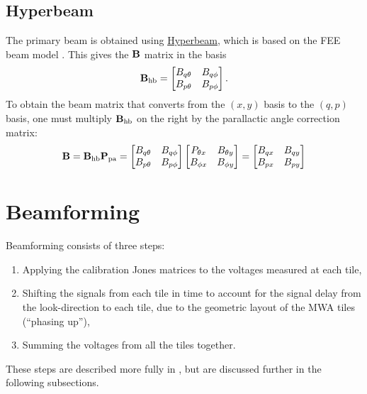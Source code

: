 \documentclass{book}
\newcommand{\pamat}{\ensuremath{{\bf P}_\text{pa}}}
\begin{document}
\subsection{Hyperbeam}
\label{sec:hyperbeam}

The primary beam is obtained using \href{https://github.com/MWATelescope/mwa_hyperbeam}{Hyperbeam}, which is based on the FEE beam model \citep{Sokolowski2017}.
This gives the ${\bf B}$ matrix in the basis
\begin{equation}
    {\bf B}_\text{hb} = \begin{bmatrix} B_{q\theta} & B_{q\phi} \\ B_{p\theta} & B_{p\phi} \end{bmatrix}.
\end{equation}
To obtain the beam matrix that converts from the $(x,y)$ basis to the $(q,p)$ basis, one must multiply ${\bf B}_\text{hb}$ on the right by the parallactic angle correction matrix:
\begin{equation}
    {\bf B} = {\bf B}_\text{hb}\pamat
            = \begin{bmatrix} B_{q\theta} & B_{q\phi} \\ B_{p\theta} & B_{p\phi} \end{bmatrix}
              \begin{bmatrix} P_{\theta x} & B_{\theta y} \\ B_{\phi x} & B_{\phi y} \end{bmatrix}
            = \begin{bmatrix} B_{qx} & B_{qy} \\ B_{px} & B_{py} \end{bmatrix}
\end{equation}

\section{Beamforming}

Beamforming consists of three steps:
\begin{enumerate}
    \item Applying the calibration Jones matrices to the voltages measured at each tile,
    \item Shifting the signals from each tile in time to account for the signal delay from the look-direction to each tile, due to the geometric layout of the MWA tiles (``phasing up''),
    \item Summing the voltages from all the tiles together.
\end{enumerate}
These steps are described more fully in \citet{Ord2019}, but are discussed further in the following subsections.
\end{document}
